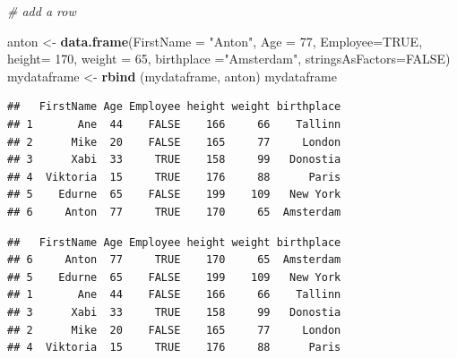 \documentclass[]{book}
\newenvironment{Shaded}{\begin{snugshade}}{\end{snugshade}}
\newcommand{\KeywordTok}[1]{\textcolor[rgb]{0.13,0.29,0.53}{\textbf{{#1}}}}
\newcommand{\DataTypeTok}[1]{\textcolor[rgb]{0.13,0.29,0.53}{{#1}}}
\newcommand{\DecValTok}[1]{\textcolor[rgb]{0.00,0.00,0.81}{{#1}}}
\newcommand{\StringTok}[1]{\textcolor[rgb]{0.31,0.60,0.02}{{#1}}}
\newcommand{\CommentTok}[1]{\textcolor[rgb]{0.56,0.35,0.01}{\textit{{#1}}}}
\newcommand{\OtherTok}[1]{\textcolor[rgb]{0.56,0.35,0.01}{{#1}}}
\newcommand{\NormalTok}[1]{{#1}}
\begin{document}
\begin{Shaded}
\begin{Highlighting}[]
\CommentTok{# add a row }

\NormalTok{anton <-}\StringTok{ }\KeywordTok{data.frame}\NormalTok{(}\DataTypeTok{FirstName =} \StringTok{"Anton"}\NormalTok{, }\DataTypeTok{Age =} \DecValTok{77}\NormalTok{, }\DataTypeTok{Employee=}\OtherTok{TRUE}\NormalTok{, }\DataTypeTok{height=} \DecValTok{170}\NormalTok{, }\DataTypeTok{weight =} \DecValTok{65}\NormalTok{, }\DataTypeTok{birthplace =}\StringTok{"Amsterdam"}\NormalTok{, }\DataTypeTok{stringsAsFactors=}\OtherTok{FALSE}\NormalTok{)}
\NormalTok{mydataframe <-}\StringTok{ }\KeywordTok{rbind} \NormalTok{(mydataframe, anton)}
\NormalTok{mydataframe}
\end{Highlighting}
\end{Shaded}

\begin{verbatim}
##   FirstName Age Employee height weight birthplace
## 1       Ane  44    FALSE    166     66    Tallinn
## 2      Mike  20    FALSE    165     77     London
## 3      Xabi  33     TRUE    158     99   Donostia
## 4  Viktoria  15     TRUE    176     88      Paris
## 5    Edurne  65    FALSE    199    109   New York
## 6     Anton  77     TRUE    170     65  Amsterdam
\end{verbatim}

\begin{Shaded}
\end{Shaded}

\begin{verbatim}
##   FirstName Age Employee height weight birthplace
## 6     Anton  77     TRUE    170     65  Amsterdam
## 5    Edurne  65    FALSE    199    109   New York
## 1       Ane  44    FALSE    166     66    Tallinn
## 3      Xabi  33     TRUE    158     99   Donostia
## 2      Mike  20    FALSE    165     77     London
## 4  Viktoria  15     TRUE    176     88      Paris
\end{verbatim}

\begin{Shaded}
\end{Shaded}
\end{document}

